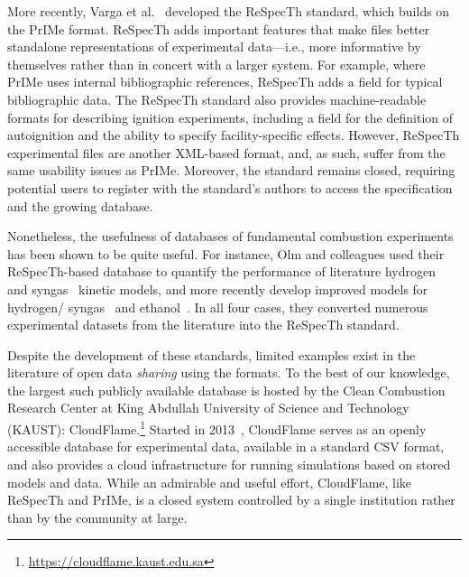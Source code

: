 \documentclass[12pt]{ijck}
\begin{document}
More recently, Varga et al.~\autocite{Varga2015a,Varga2015b} developed the
ReSpecTh standard, which builds on the PrIMe format. ReSpecTh adds important
features that make files better standalone representations of experimental
data---i.e., more informative by themselves rather than in concert with a larger
system. For example, where PrIMe uses internal bibliographic references,
ReSpecTh adds a field for typical bibliographic data. The ReSpecTh standard also
provides machine-readable formats for describing ignition experiments, including
a field for the definition of autoignition and the ability to specify
facility-specific effects. However, ReSpecTh experimental files are another
XML-based format, and, as such, suffer from the same usability issues as PrIMe.
Moreover, the standard remains closed, requiring potential users to register
with the standard's authors to access the specification and the growing database.

Nonetheless, the usefulness of databases of fundamental combustion experiments
has been shown to be quite useful. For instance, Olm and colleagues used their
ReSpecTh-based database to quantify the performance of literature
hydrogen~\autocite{Olm:2014gn} and syngas~\autocite{Olm:2015ch} kinetic models,
and more recently develop improved models for hydrogen\slash
syngas~\autocite{Varga:2016gj} and ethanol~\autocite{Olm:2016et}. In all four
cases, they converted numerous experimental datasets from the literature into
the ReSpecTh standard.

Despite the development of these standards, limited examples exist in the
literature of open data \emph{sharing} using the formats. To the best
of our knowledge, the largest such publicly available database is hosted by
the Clean Combustion Research Center at King Abdullah University of Science and
Technology (KAUST): CloudFlame.\footnote{\url{https://cloudflame.kaust.edu.sa}}
Started in 2013~\autocite{Goteng:2013cf,Goteng:2014,ReynoChiasson:2015}, CloudFlame
serves as an openly accessible database for experimental data, available in a standard
CSV format, and also provides a cloud infrastructure for running simulations
based on stored models and data. While an admirable and useful effort,
CloudFlame, like ReSpecTh and PrIMe, is a closed system controlled by a single
institution rather than by the community at large.
\end{document}
